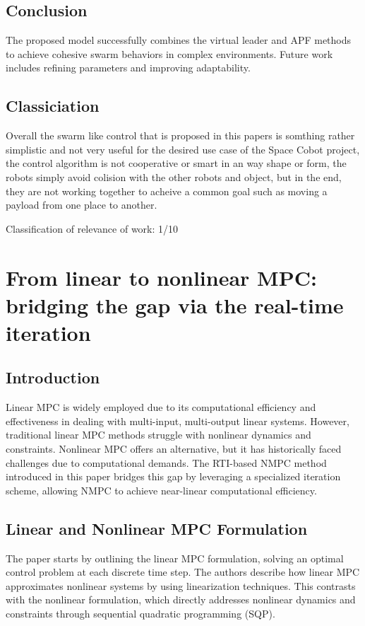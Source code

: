 \documentclass[a4paper,12pt]{article}
\begin{document}
    \subsection{Conclusion}
        The proposed model successfully combines the virtual leader and APF methods to achieve cohesive swarm behaviors in complex environments. Future work includes refining parameters and improving adaptability.


  
    \subsection{Classiciation}
        Overall the swarm like control that is proposed in this papers is somthing rather simplistic and not very useful for the desired use case of the Space Cobot project, the control algorithm is not cooperative or smart in an way shape or form, the robots simply avoid colision with the other robots and object, but in the end, they are not working together to acheive a common goal such as moving a payload from one place to another.

    Classification of relevance of work: 1/10

\section{From linear to nonlinear MPC: bridging the gap via
the real-time iteration}

    \subsection{Introduction}
    Linear MPC is widely employed due to its computational efficiency and effectiveness in dealing with multi-input, multi-output linear systems. However, traditional linear MPC methods struggle with nonlinear dynamics and constraints. Nonlinear MPC offers an alternative, but it has historically faced challenges due to computational demands. The RTI-based NMPC method introduced in this paper bridges this gap by leveraging a specialized iteration scheme, allowing NMPC to achieve near-linear computational efficiency.
    
    \subsection{Linear and Nonlinear MPC Formulation}
    The paper starts by outlining the linear MPC formulation, solving an optimal control problem at each discrete time step. The authors describe how linear MPC approximates nonlinear systems by using linearization techniques. This contrasts with the nonlinear formulation, which directly addresses nonlinear dynamics and constraints through sequential quadratic programming (SQP).
    
\end{document}
